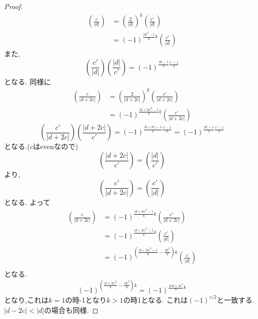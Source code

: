 \begin{proof}
\begin{align*}
\left(\frac{c}{|d|} \right) 
& = \left(\frac{2}{|d|} \right)^k \left(\frac{c'}{|d|}\right) \\
& = (-1)^{\frac{|d|^2 -1}{8}k}\left(\frac{c'}{|d|}\right)
\end{align*}
また,
\begin{equation*}
\left( \frac{c'}{|d|} \right) \left( \frac{|d|}{c'} \right)
= (-1)^{\frac{|d|-1}{2} \frac{c'-1}{2}}
\end{equation*}
となる.
同様に
\begin{align*}
\left(\frac{c}{|d + 2c|} \right) 
& = \left(\frac{2}{|d + 2c|} \right)^k \left(\frac{c'}{|d + 2c|}\right) \\
& = (-1)^{\frac{|d + 2c|^2 -1}{8}k}\left(\frac{c'}{|d+2c|}\right)
\end{align*}
\begin{equation*}
\left( \frac{c'}{|d + 2c|} \right) \left( \frac{|d + 2c|}{c'} \right)
= (-1)^{\frac{|d + 2c|-1}{2} \frac{c'-1}{2}}
= (-1)^{\frac{|d |-1}{2} \frac{c'-1}{2}}
\end{equation*}
となる.($c$はevenなので)
\begin{equation*}
    \left(\frac{|d + 2c| }{c'} \right) = \left( \frac{|d|}{c'}\right)
\end{equation*}
より,
\begin{equation*}
\left( \frac{c'}{|d + 2c|}\right) =  \left( \frac{c'}{|d|} \right)
\end{equation*}
となる.
よって
\begin{align*}
\left( \frac{c}{|d + 2c|} \right) 
& = (-1)^{\frac{|d + 2c|^2 -1}{8}k}\left( \frac{c'}{|d + 2c|}\right)  \\
& = (-1)^{\frac{|d + 2c|^2 -1}{8}k} \left( \frac{c'}{|d|} \right) \\
& = (-1)^{(\frac{|d + 2c|^2 -1}{8} - \frac{|d|^2}{8}) k} \left( \frac{c}{|d|} \right) \\
\end{align*}
となる.
\begin{equation*}
(-1)^{(\frac{|d + 2c|^2 }{8} - \frac{|d|^2}{8}) k} = (-1)^{\frac{4cd + 4c^2}{8}k}
\end{equation*}
となり,これは$k=1$の時-1となり$k >1$の時1となる.
これは$(-1)^{c/2}$と一致する.
$|d-2c| < |d|$の場合も同様.


\end{proof}
